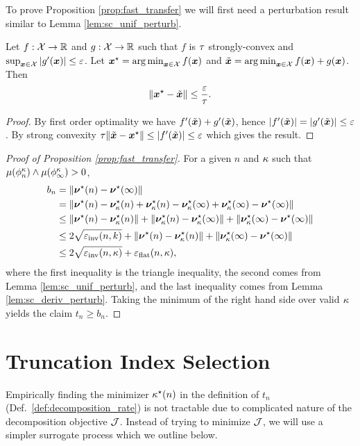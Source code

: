 To prove Proposition \ref{prop:fast_transfer} we will first need a perturbation result similar to Lemma \ref{lem:sc_unif_perturb}.
\begin{lemma}\label{lem:sc_deriv_perturb}
    Let $f : \mathcal{X} \to \mathbb{R}$ and $g : \mathcal{X} \to \mathbb{R}$ such that $f$ is $\tau$ strongly-convex and $\sup_{{\boldsymbol x} \in \mathcal{X}} |g'({\boldsymbol x})| \leq \varepsilon$. Let ${\boldsymbol x}^\star = \operatorname*{arg\,min}_{{\boldsymbol x} \in \mathcal{X}} f({\boldsymbol x})$ and $\tilde{{\boldsymbol x}} = \operatorname*{arg\,min}_{{\boldsymbol x} \in \mathcal{X}} f({\boldsymbol x}) + g({\boldsymbol x})$. Then
    \[
        \norm{{\boldsymbol x}^\star - \tilde{{\boldsymbol x}}} \leq \frac{\varepsilon}{\tau}.
    \]
\end{lemma}
\begin{proof}
    By first order optimality we have $f'(\tilde{{\boldsymbol x}}) + g'(\tilde{{\boldsymbol x}})$, hence $|f'(\tilde{{\boldsymbol x}})| = |g'(\tilde{{\boldsymbol x}})| \leq \varepsilon$. By strong convexity $\tau \norm{\tilde{{\boldsymbol x}} - {\boldsymbol x}^\star} \leq |f'(\tilde{{\boldsymbol x}})| \leq \varepsilon$ which gives the result.
\end{proof}
\begin{proof}[Proof of Proposition \ref{prop:fast_transfer}]
    For a given $n$ and $\kappa$ such that $\mu(\phi_n^\kappa) \wedge \mu(\phi_\infty^\kappa) > 0$,
    \begin{align*}
        b_n &= \norm{\bm{\nu}^\star(n) - \bm{\nu}^\star(\infty)}\\
        &=  \norm{\bm{\nu}^\star(n) - \bm{\nu}^\star_{\kappa}(n) + \bm{\nu}^\star_{\kappa}(n) - \bm{\nu}^\star_{\kappa}(\infty) + \bm{\nu}^\star_{\kappa}(\infty) - \bm{\nu}^\star(\infty)}\\
        &\leq  \norm{\bm{\nu}^\star(n) - \bm{\nu}^\star_{\kappa}(n)}  + \norm{\bm{\nu}^\star_{\kappa}(n) - \bm{\nu}^\star_{\kappa}(\infty)} + \norm{\bm{\nu}^\star_{\kappa}(\infty) - \bm{\nu}^\star(\infty)}\\
        &\leq 2 \sqrt{\varepsilon_{\mathrm{inv}}(n, k)} + \norm{\bm{\nu}^\star(n) - \bm{\nu}^\star_{\kappa}(n)}  + \norm{\bm{\nu}^\star_{\kappa}(\infty) - \bm{\nu}^\star(\infty)}\\
        &\leq 2 \sqrt{\varepsilon_{\mathrm{inv}}(n, \kappa)} + \varepsilon_{\mathrm{flat}}(n, \kappa),
    \end{align*}
    where the first inequality is the triangle inequality, the second comes from Lemma \ref{lem:sc_unif_perturb}, and the last inequality comes from Lemma \ref{lem:sc_deriv_perturb}. Taking the minimum of the right hand side over valid $\kappa$ yields the claim $t_n \geq b_n$.
\end{proof}

\newpage
\section{Truncation Index Selection}\label{app:selection_process}
Empirically finding the minimizer $\kappa^\star(n)$ in the definition of $t_n$ (Def.\ \ref{def:decomposition_rate}) is not tractable due to complicated nature of the decomposition objective $\mathcal{J}$. Instead of trying to minimize $\mathcal{J}$, we will use a simpler surrogate process which we outline below. 

